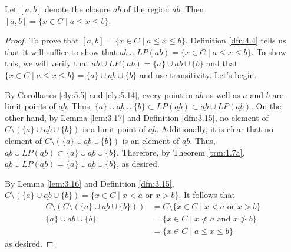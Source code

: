 \documentclass[../main.tex]{subfiles}
\begin{document}
\begin{corollary}\label{cly:5.15}
    Let $[a,b]$ denote the closure $\overline{\underline{ab}}$ of the region $\underline{ab}$. Then $[a,b]=\{x\in C\mid a\leq x\leq b\}$.
    \begin{proof}
        To prove that $[a,b]=\{x\in C\mid a\leq x\leq b\}$, Definition \ref{dfn:4.4} tells us that it will suffice to show that $\underline{ab}\cup LP(\underline{ab})=\{x\in C\mid a\leq x\leq b\}$. To show this, we will verify that $\underline{ab}\cup LP(\underline{ab})=\{a\}\cup\underline{ab}\cup\{b\}$ and that $\{x\in C\mid a\leq x\leq b\}=\{a\}\cup\underline{ab}\cup\{b\}$ and use transitivity. Let's begin.\par
        By Corollaries \ref{cly:5.5} and \ref{cly:5.14}, every point in $\underline{ab}$ as well as $a$ and $b$ are limit points of $\underline{ab}$. Thus, $\{a\}\cup\underline{ab}\cup\{b\}\subset LP(\underline{ab})\subset\underline{ab}\cup LP(\underline{ab})$. On the other hand, by Lemma \ref{lem:3.17} and Definition \ref{dfn:3.15}, no element of $C\setminus(\{a\}\cup\underline{ab}\cup\{b\})$ is a limit point of $\underline{ab}$. Additionally, it is clear that no element of $C\setminus(\{a\}\cup\underline{ab}\cup\{b\})$ is an element of $\underline{ab}$. Thus, $\underline{ab}\cup LP(\underline{ab})\subset\{a\}\cup\underline{ab}\cup\{b\}$. Therefore, by Theorem \ref{trm:1.7a}, $\underline{ab}\cup LP(\underline{ab})=\{a\}\cup\underline{ab}\cup\{b\}$, as desired.\par
        By Lemma \ref{lem:3.16} and Definition \ref{dfn:3.15}, $C\setminus(\{a\}\cup\underline{ab}\cup\{b\})=\{x\in C\mid x<a\text{ or }x>b\}$. It follows that
        \begin{align*}
            C\setminus(C\setminus(\{a\}\cup\underline{ab}\cup\{b\})) &= C\setminus\{x\in C\mid x<a\text{ or }x>b\}\\
            \{a\}\cup\underline{ab}\cup\{b\} &= \{x\in C\mid x\not<a\text{ and }x\not>b\}\\
            &= \{x\in C\mid a\leq x\leq b\}
        \end{align*}
        as desired.
    \end{proof}
\end{corollary}
\end{document}
